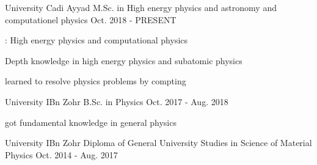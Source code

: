 

\begin{cventries}

  \cventry
    {University Cadi Ayyad} %
        {M.Sc. in High energy physics and astronomy and computationel physics } %
    {} %
    {Oct. 2018 - PRESENT} %
    {
      \begin{cvitems} %
        \item { :  High energy physics and computational physics}
        \item {Depth knowledge in high energy physics and subatomic physics}
        \item {learned  to resolve physics problems by compting }
      \end{cvitems}
    }

      \cventry
    {University IBn Zohr} %
        {B.Sc. in Physics} %
    {} %
    {Oct. 2017 - Aug. 2018} %
    {
      \begin{cvitems} %
        \item {got fundamental knowledge in general  physics}
      \end{cvitems}
    }

          \cventry
    {University IBn Zohr} %
        {Diploma of General University Studies in Science of Material Physics} %
    {} %
    {Oct. 2014 - Aug. 2017} %
    {
    }
    

\end{cventries}
